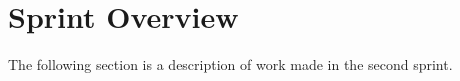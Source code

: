 \section{Sprint Overview}

The following section is a description of work made in the second sprint.



